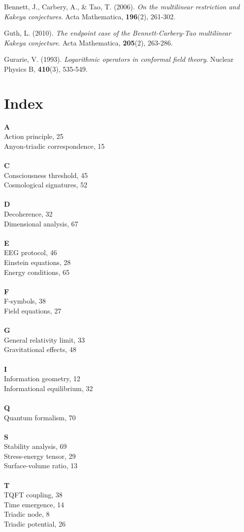 \documentclass[openany]{memoir}
\theoremstyle{definition}
\theoremstyle{plain}
\theoremstyle{remark}
\begin{document}
\begin{thebibliography}{99}
Bennett, J., Carbery, A., \& Tao, T. (2006). 
\textit{On the multilinear restriction and Kakeya conjectures}. 
Acta Mathematica, \textbf{196}(2), 261-302.

Guth, L. (2010). 
\textit{The endpoint case of the Bennett-Carbery-Tao multilinear Kakeya conjecture}. 
Acta Mathematica, \textbf{205}(2), 263-286.

Gurarie, V. (1993). 
\textit{Logarithmic operators in conformal field theory}. 
Nuclear Physics B, \textbf{410}(3), 535-549.

\end{thebibliography}

\chapter*{Index}

\noindent
\textbf{A}\\
Action principle, 25\\
Anyon-triadic correspondence, 15\\
\\
\textbf{C}\\
Consciousness threshold, 45\\
Cosmological signatures, 52\\
\\
\textbf{D}\\
Decoherence, 32\\
Dimensional analysis, 67\\
\\
\textbf{E}\\
EEG protocol, 46\\
Einstein equations, 28\\
Energy conditions, 65\\
\\
\textbf{F}\\
F-symbols, 38\\
Field equations, 27\\
\\
\textbf{G}\\
General relativity limit, 33\\
Gravitational effects, 48\\
\\
\textbf{I}\\
Information geometry, 12\\
Informational equilibrium, 32\\
\\
\textbf{Q}\\
Quantum formalism, 70\\
\\
\textbf{S}\\
Stability analysis, 69\\
Stress-energy tensor, 29\\
Surface-volume ratio, 13\\
\\
\textbf{T}\\
TQFT coupling, 38\\
Time emergence, 14\\
Triadic node, 8\\
Triadic potential, 26
\end{document}
